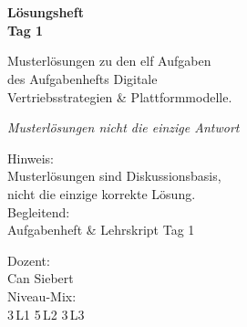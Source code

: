 \documentclass[11pt,a4paper,oneside]{article}
\newcommand{\caveatfontfallback}{\itshape}
\newcommand\caveatfont{\caveatfontfallback}%
\begin{document}
\begin{titlepage}
  \pagestyle{empty}
  \vspace*{1.5cm}
  \\[2pt]
  \noindent{\color{lpAccent}\rule{\linewidth}{1.2pt}}\\[4pt]

  \vspace{3cm}
  {\sffamily\fontsize{30}{34}\selectfont\bfseries\color{lpInk}Lösungsheft\\Tag 1\par}

  \vspace{0.7cm}
  {\sffamily\large\color{lpGray}Musterlösungen zu den elf Aufgaben\\des Aufgabenhefts \textendash{} Digitale\\Vertriebsstrategien \& Plattformmodelle.\par}

  \vspace{1.5cm}
  {\caveatfont\LARGE\color{lpGreen}Musterlösungen \textperiodcentered{} nicht die einzige Antwort}\par

  \vfill

  \noindent\begin{minipage}{0.55\linewidth}
    {\sffamily\footnotesize\color{lpGray}Hinweis:}\\
    {\sffamily\small\color{lpInk}Musterlösungen sind Diskussionsbasis,\\nicht die einzige korrekte Lösung.}\\[10pt]
    {\sffamily\footnotesize\color{lpGray}Begleitend:}\\
    {\sffamily\small\color{lpInk}Aufgabenheft \& Lehrskript Tag 1}
  \end{minipage}\hfill
  \begin{minipage}{0.4\linewidth}
    \raggedleft
    {\sffamily\footnotesize\color{lpGray}Dozent:}\\
    {\sffamily\small\color{lpInk}Can Siebert}\\[10pt]
    {\sffamily\footnotesize\color{lpGray}Niveau-Mix:}\\
    {\sffamily\small\color{lpInk}3\,L1 \textperiodcentered{} 5\,L2 \textperiodcentered{} 3\,L3}
  \end{minipage}

  \vspace{0.5cm}
  \noindent{\color{lpAccent}\rule{\linewidth}{0.6pt}}
\end{titlepage}
\end{document}
